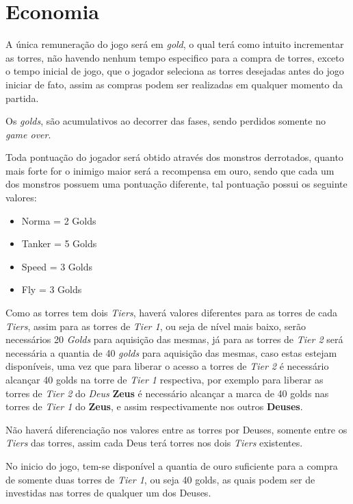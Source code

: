 \documentclass[11pt]{article} %
\begin{document}
\section{Economia}

A única remuneração do jogo será em \textit{gold}, o qual terá como intuito incrementar as torres, não havendo nenhum tempo especifico para a compra de torres, exceto o tempo inicial de jogo, que o jogador seleciona as torres desejadas antes do jogo iniciar de fato, assim as compras podem ser realizadas em qualquer momento da partida.

Os \textit{golds}, são acumulativos ao decorrer das fases, sendo perdidos somente no \textit{game over}.

Toda pontuação do jogador será obtido através dos monstros derrotados, quanto mais forte for o inimigo  maior será a recompensa em ouro, sendo que cada um dos monstros possuem uma pontuação diferente, tal pontuação possui os seguinte valores:

\begin{itemize}
 \item Norma = 2 Golds
 \item Tanker = 5 Golds
 \item Speed = 3 Golds
 \item Fly = 3 Golds
 \end{itemize} 
 
Como as torres tem dois \textit{Tiers}, haverá valores diferentes para as torres de cada \textit{Tiers}, assim para as torres de \textit{Tier 1}, ou seja de nível mais baixo, serão necessários 20 \textit{Golds} para aquisição das mesmas, já para as torres de \textit{Tier 2} será necessária a quantia de 40 \textit{golds} para aquisição das mesmas, caso estas estejam disponíveis, uma vez que para liberar o acesso a torres de \textit{Tier 2} é necessário alcançar 40 golds na torre de \textit{Tier 1} respectiva, por exemplo para liberar as torres de \textit{Tier 2} do \textit{Deus} \textbf{Zeus} é necessário alcançar a marca de 40 golds nas torres de \textit{Tier 1} do \textbf{Zeus}, e assim respectivamente nos outros \textbf{Deuses}.

Não haverá diferenciação nos valores entre as torres por Deuses, somente entre os \textit{Tiers} das torres, assim cada Deus terá torres nos dois \textit{Tiers} existentes.
 
No inicio do jogo, tem-se disponível a quantia de ouro suficiente para a compra de somente duas torres de \textit{Tier 1}, ou seja 40 golds, as quais podem ser de investidas nas torres de qualquer um dos Deuses.  
\end{document}
